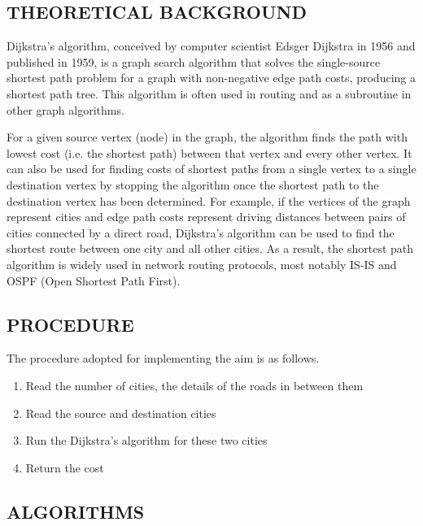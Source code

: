    \subsection{THEORETICAL BACKGROUND}
		\par Dijkstra's algorithm, conceived by computer scientist Edsger Dijkstra in 1956 and published in 1959, is a graph search algorithm that solves the single-source shortest path problem for a graph with non-negative edge path costs, producing a shortest path tree. This algorithm is often used in routing and as a subroutine in other graph algorithms.
		\par For a given source vertex (node) in the graph, the algorithm finds the path with lowest cost (i.e. the shortest path) between that vertex and every other vertex. It can also be used for finding costs of shortest paths from a single vertex to a single destination vertex by stopping the algorithm once the shortest path to the destination vertex has been determined. For example, if the vertices of the graph represent cities and edge path costs represent driving distances between pairs of cities connected by a direct road, Dijkstra's algorithm can be used to find the shortest route between one city and all other cities. As a result, the shortest path algorithm is widely used in network routing protocols, most notably IS-IS and OSPF (Open Shortest Path First).
	
\newpage
	\subsection{PROCEDURE}
		\par The procedure adopted for implementing the aim is as follows.
		\begin{enumerate}
			\item Read the number of cities, the details of the roads in between them
			\item Read the source and destination cities
			\item Run the Dijkstra's algorithm for these two cities
			\item Return the cost
		\end{enumerate}
	
	\subsection{ALGORITHMS}
	
